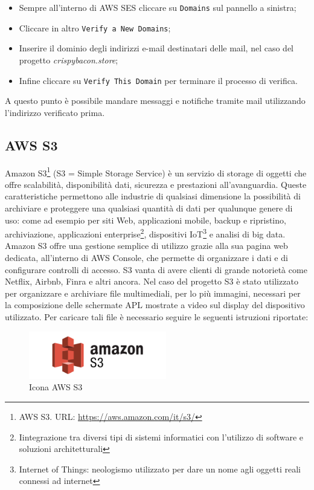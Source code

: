 \begin{itemize}
    \item Sempre all'interno di AWS SES cliccare su \texttt{Domains} sul pannello a sinistra;
    \item Cliccare in altro \texttt{Verify a New Domains};
    \item Inserire il dominio degli indirizzi e-mail destinatari delle mail, nel caso del progetto \textit{crispybacon.store};
    \item Infine cliccare su \texttt{Verify This Domain} per terminare il processo di verifica.
\end{itemize}
A questo punto è possibile mandare messaggi e notifiche tramite mail utilizzando l'indirizzo verificato prima.
\newpage
\subsection{AWS S3}
Amazon S3\footnote{AWS S3. URL: \href{https://aws.amazon.com/it/s3/}{https://aws.amazon.com/it/s3/}} (S3 = Simple Storage Service) è un servizio di storage di oggetti che offre scalabilità, disponibilità dati, sicurezza e prestazioni all'avanguardia. Queste caratteristiche permettono alle industrie di qualsiasi dimensione la possibilità di archiviare e proteggere una qualsiasi quantità di dati per qualunque genere di uso: come ad esempio per siti Web, applicazioni mobile, backup e ripristino, archiviazione, applicazioni enterprise\footnote{Iintegrazione tra diversi tipi di sistemi informatici con l'utilizzo di software e soluzioni architetturali}, dispositivi IoT\footnote{Internet of Things: neologismo utilizzato per dare un nome agli oggetti reali connessi ad internet} e analisi di big data. Amazon S3 offre una gestione semplice di utilizzo grazie alla sua pagina web dedicata, all'interno di AWS Console, che permette di organizzare i dati e di configurare controlli di accesso. S3 vanta di avere clienti di grande notorietà come Netflix, Airbnb, Finra e altri ancora. Nel caso del progetto S3 è stato utilizzato per organizzare e archiviare file multimediali, per lo più immagini, necessari per la composizione delle schermate APL mostrate a video sul display del dispositivo utilizzato. Per caricare tali file è necessario seguire le seguenti istruzioni riportate:
\\[0.5cm]
\begin{minipage}{0.4\textwidth}
	\begin{figure}[H]
		\includegraphics[width=6cm]{immagini/amazon-s3.png}
		\caption{\label{fig:icona_aws_s3}Icona AWS S3}
	\end{figure}
\end{minipage}
